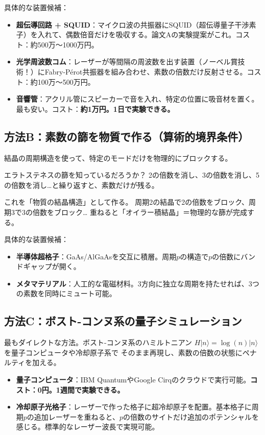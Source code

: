 \documentclass[12pt,a4paper]{article}
\begin{document}
具体的な装置候補：
\begin{itemize}
\item \textbf{超伝導回路 + SQUID}：マイクロ波の共振器にSQUID（超伝導量子干渉素子）を入れて、偶数倍音だけを吸収する。論文Aの実験提案がこれ。コスト：約500万〜1000万円。
\item \textbf{光学周波数コム}：レーザーが等間隔の周波数を出す装置（ノーベル賞技術！）にFabry-P\'erot共振器を組み合わせ、素数の倍数だけ反射させる。コスト：約100万〜500万円。
\item \textbf{音響管}：アクリル管にスピーカーで音を入れ、特定の位置に吸音材を置く。最も安い。コスト：\textbf{約1万円。1日で実験できる。}
\end{itemize}

\subsection{方法B：素数の篩を物質で作る（算術的境界条件）}

結晶の周期構造を使って、特定のモードだけを物理的にブロックする。

\begin{analogybox}
エラトステネスの篩を知っているだろうか？
2の倍数を消し、3の倍数を消し、5の倍数を消し…と繰り返すと、素数だけが残る。

これを「物質の結晶構造」として作る。
周期2の結晶で2の倍数をブロック、周期3で3の倍数をブロック…
重ねると「オイラー積結晶」＝物理的な篩が完成する。
\end{analogybox}

具体的な装置候補：
\begin{itemize}
\item \textbf{半導体超格子}：GaAs/AlGaAsを交互に積層。周期$p$の構造で$p$の倍数にバンドギャップが開く。
\item \textbf{メタマテリアル}：人工的な電磁材料。3方向に独立な周期を持たせれば、3つの素数を同時にミュート可能。
\end{itemize}

\subsection{方法C：ボスト-コンヌ系の量子シミュレーション}

最もダイレクトな方法。ボスト-コンヌ系のハミルトニアン
$H|n\rangle = \log(n)|n\rangle$ を量子コンピュータや冷却原子系で
そのまま再現し、素数の倍数の状態にペナルティを加える。

\begin{itemize}
\item \textbf{量子コンピュータ}：IBM QuantumやGoogle Cirqのクラウドで実行可能。\textbf{コスト：0円。1週間で実験できる。}
\item \textbf{冷却原子光格子}：レーザーで作った格子に超冷却原子を配置。基本格子に周期$p$の追加レーザーを重ねると、$p$の倍数のサイトだけ追加のポテンシャルを感じる。標準的なレーザー波長で実現可能。
\end{itemize}
\end{document}
